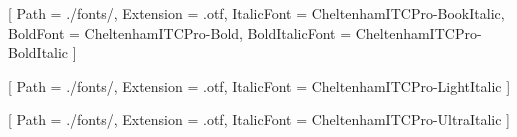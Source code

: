 
\setmainfont{CheltenhamITCPro-Book}[
Path = ./fonts/,
Extension = .otf,
ItalicFont = CheltenhamITCPro-BookItalic,
BoldFont = CheltenhamITCPro-Bold,
BoldItalicFont = CheltenhamITCPro-BoldItalic
]

\newfontfamily{}[
Path = ./fonts/,
Extension = .otf,
ItalicFont = CheltenhamITCPro-LightItalic
]

\newfontfamily{}[
Path = ./fonts/,
Extension = .otf,
ItalicFont = CheltenhamITCPro-UltraItalic
]


\providecommand{\useFontLight}{}
\providecommand{\useFontUltra}{}
